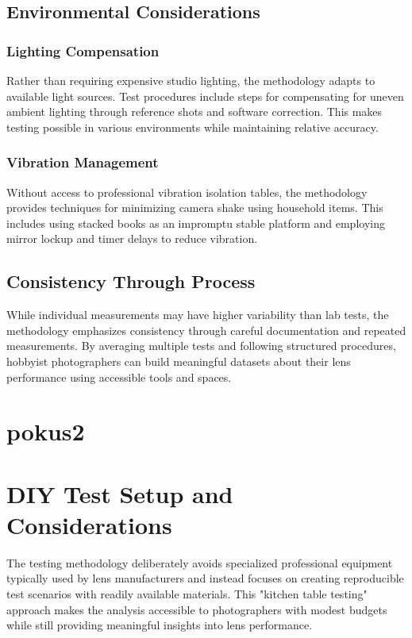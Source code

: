 \subsection{Environmental Considerations}

\subsubsection{Lighting Compensation}
Rather than requiring expensive studio lighting, the methodology adapts to available light sources. Test procedures include steps for compensating for uneven ambient lighting through reference shots and software correction. This makes testing possible in various environments while maintaining relative accuracy.

\subsubsection{Vibration Management}
Without access to professional vibration isolation tables, the methodology provides techniques for minimizing camera shake using household items. This includes using stacked books as an impromptu stable platform and employing mirror lockup and timer delays to reduce vibration.

\subsection{Consistency Through Process}

While individual measurements may have higher variability than lab tests, the methodology emphasizes consistency through careful documentation and repeated measurements. By averaging multiple tests and following structured procedures, hobbyist photographers can build meaningful datasets about their lens performance using accessible tools and spaces.


\section{pokus2}

\section{DIY Test Setup and Considerations}

The testing methodology deliberately avoids specialized professional equipment typically used by lens manufacturers and instead focuses on creating reproducible test scenarios with readily available materials. This "kitchen table testing" approach makes the analysis accessible to photographers with modest budgets while still providing meaningful insights into lens performance.

